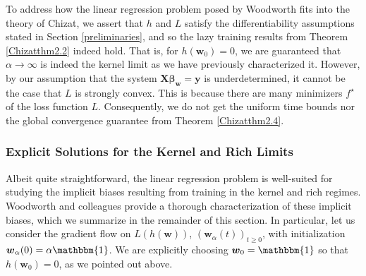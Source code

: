 \documentclass{article}
\begin{document}
To address how the linear regression problem posed by Woodworth fits into the theory of Chizat, we assert that $h$ and $L$ satisfy the differentiability assumptions stated in Section \ref{preliminaries}, and so the lazy training results from Theorem \ref{Chizatthm2.2} indeed hold. That is, for $h(\boldsymbol{w}_0) = 0$, we are guaranteed that $\alpha \rightarrow \infty$ is indeed the kernel limit as we have previously characterized it. However, by our assumption that the system $\boldsymbol{X} \boldsymbol{\beta}_{\boldsymbol{w}} = \boldsymbol{y}$ is underdetermined, it cannot be the case that $L$ is strongly convex. This is because there are many minimizers $f^{\star}$ of the loss function $L$. Consequently, we do not get the uniform time bounds nor the global convergence guarantee from Theorem \ref{Chizatthm2.4}.

\subsubsection{Explicit Solutions for the Kernel and Rich Limits}
Albeit quite straightforward, the linear regression problem is well-suited for studying the implicit biases resulting from training in the kernel and rich regimes. Woodworth and colleagues provide a thorough characterization of these implicit biases, which we summarize in the remainder of this section. In particular, let us consider the gradient flow on $L(h(\boldsymbol{w}))$, $(\boldsymbol{w}_{\alpha}(t))_{t \geq 0}$, with initialization $\boldsymbol{w}_{\alpha}(0) = \alpha \mathbbm{1}$. We are explicitly choosing $\boldsymbol{w}_0 = \mathbbm{1}$ so that $h(\boldsymbol{w}_0) = 0$, as we pointed out above.
\end{document}
